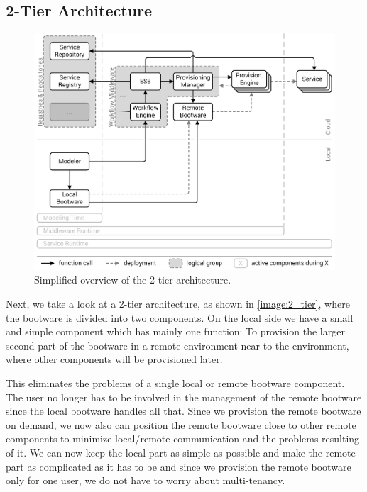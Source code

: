 \subsection{2-Tier Architecture}
\label{design:division:2tier}

\begin{figure}[!htbp]
	\centering
	\includegraphics[resolution=600]{design/assets/2_tier}
	\caption{Simplified overview of the 2-tier architecture.}
	\label{image:2_tier}
\end{figure}

Next, we take a look at a 2-tier architecture, as shown in \autoref{image:2_tier}, where the bootware is divided into two components.
On the local side we have a small and simple component which has mainly one function: To provision the larger second part of the bootware in a remote environment near to the environment, where other components will be provisioned later.

This eliminates the problems of a single local or remote bootware component.
The user no longer has to be involved in the management of the remote bootware since the local bootware handles all that.
Since we provision the remote bootware on demand, we now also can position the remote bootware close to other remote components to minimize local/remote communication and the problems resulting of it.
We can now keep the local part as simple as possible and make the remote part as complicated as it has to be and since we provision the remote bootware only for one user, we do not have to worry about multi-tenancy.

